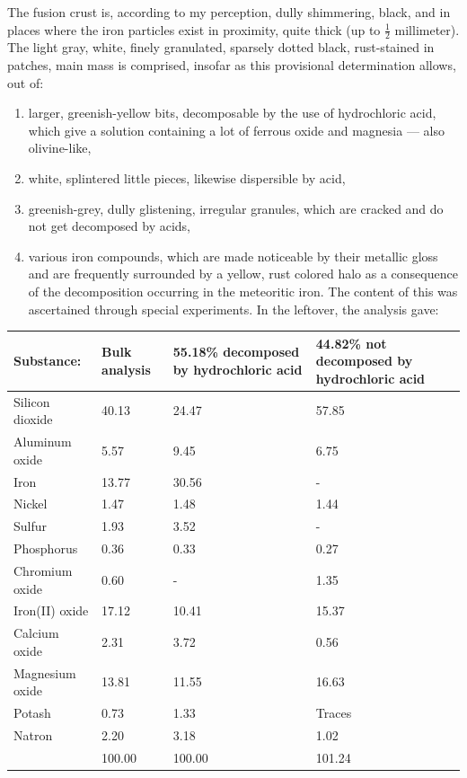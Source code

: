 \documentclass[a4paper, 12pt, oneside]{article}
\begin{document}
The fusion crust is, according to my perception, dully shimmering, black, and in places where the iron particles exist in proximity, quite thick (up to $\frac{1}{2}$ millimeter). The light gray, white, finely granulated, sparsely dotted black, rust-stained in patches, main mass is comprised, insofar as this provisional determination allows, out of:
\begin{enumerate}
    \item larger, greenish-yellow bits, decomposable by the use of hydrochloric acid, which give a solution containing a lot of ferrous oxide and magnesia --- also olivine-like,
    \item white, splintered little pieces, likewise dispersible by acid,
    \item greenish-grey, dully glistening, irregular granules, which are cracked and do not get decomposed by acids,
    \item various iron compounds, which are made noticeable by their metallic gloss and are frequently surrounded by a yellow, rust colored halo as a consequence of the decomposition occurring in the meteoritic iron. The content of this was ascertained through special experiments. In the leftover, the analysis gave:
\end{enumerate}
\begin{center}
    \begin{tabular}{ |l|p{1.5cm}|p{3.2cm}|p{2.9cm}| }
        \hline
        Substance: & Bulk analysis & 55.18\% decomposed by hydrochloric acid & 44.82\% not decomposed by hydrochloric acid\\\hline
        Silicon dioxide & 40.13 & 24.47 & 57.85\\\hline
        Aluminum oxide & 5.57 & 9.45 & 6.75\\\hline
        Iron & 13.77 & 30.56 & -\\\hline
        Nickel & 1.47 & 1.48 & 1.44\\\hline
        Sulfur & 1.93 & 3.52 & -\\\hline
        Phosphorus & 0.36 & 0.33 & 0.27\\\hline
        Chromium oxide & 0.60 & - & 1.35\\\hline
        Iron(II) oxide & 17.12 & 10.41 & 15.37\\\hline
        Calcium oxide & 2.31 & 3.72 & 0.56\\\hline
        Magnesium oxide & 13.81 & 11.55 & 16.63\\\hline
        Potash & 0.73 & 1.33 & Traces\\\hline
        Natron & 2.20 & 3.18 & 1.02\\\hline
        & 100.00 & 100.00 & 101.24\\
        \hline
    \end{tabular}
\end{center}
\end{document}
